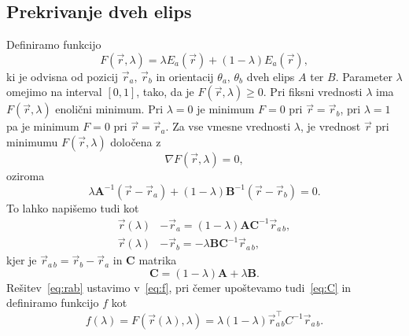 \subsection{Prekrivanje dveh elips}
Definiramo funkcijo
\begin{equation}
    F(\vec{r}, \lambda) = \lambda E_a (\vec{r}) + (1 - \lambda) E_a (\vec{r}),
    \label{eq:f}
\end{equation}
ki je odvisna od pozicij $\vec{r}_a, \, \vec{r}_b$ in orientacij $\theta_a, \, \theta_b$
dveh elips $A$ ter $B$. Parameter $\lambda$ omejimo na interval $[0,1]$, tako, da je 
$F(\vec{r}, \lambda) \geq 0$. Pri fiksni vrednosti $\lambda$ ima $F(\vec{r}, \lambda)$
enolični minimum. Pri $\lambda=0$ je minimum $F=0$ pri $\vec{r} = \vec{r}_b$, pri 
$\lambda=1$ pa je minimum $F=0$ pri $\vec{r} = \vec{r}_a$. Za vse vmesne vrednosti
$\lambda$, je vrednost $\vec{r}$ pri minimumu $F(\vec{r}, \lambda)$ določena z
\begin{equation}
    \nabla F(\vec{r}, \lambda) = 0,
\end{equation}
oziroma
\begin{equation}
    \lambda \mathbf{A}^{-1} (\vec{r} - \vec{r}_a) + (1-\lambda) \mathbf{B}^{-1}
    (\vec{r} - \vec{r}_b) = 0.
\end{equation}
To lahko napišemo tudi kot
\begin{align}
    \vec{r}(\lambda) &- \vec{r}_a = (1-\lambda) \mathbf{A} \mathbf{C}^{-1} 
        \vec{r}_{a\,b}, \nonumber \\
    \vec{r}(\lambda) &- \vec{r}_b = - \lambda \mathbf{B} \mathbf{C}^{-1} \vec{r}_{a\,b}, 
    \label{eq:rab}
\end{align}
kjer je $\vec{r}_{a\,b} = \vec{r}_b - \vec{r}_a$ in $\mathbf{C}$ matrika
\begin{equation}
    \mathbf{C} = (1-\lambda) \mathbf{A} + \lambda \mathbf{B}.
    \label{eq:C}
\end{equation}
Rešitev~\ref{eq:rab} ustavimo v~\ref{eq:f}, pri čemer upoštevamo tudi~\ref{eq:C}
in definiramo funkcijo $f$ kot
\begin{equation}
    f(\lambda) = F (\vec{r}(\lambda), \lambda) = \lambda (1-\lambda)
        \vec{r}_{a\,b}^{\top} C^{-1} \vec{r}_{a\,b}.
\end{equation}

